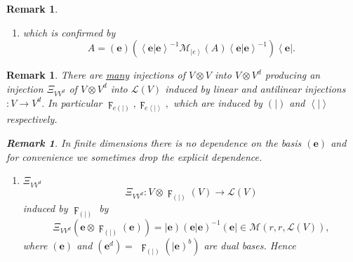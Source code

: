 \documentclass[aps,preprint]{revtex4}%
\newtheorem{remark}[theorem]{Remark}
\begin{document}
\begin{remark}
\begin{enumerate}
\item which is confirmed by
\begin{equation}
A=\left(  \mathbf{e}\right)  \left(  \overset{}{\left\langle \left.
\mathbf{e}\right\vert \mathbf{e}\right\rangle ^{-1}\mathcal{M}_{\left\vert
e\right\rangle }\left(  A\right)  \left\langle \left.  \mathbf{e}\right\vert
\mathbf{e}\right\rangle ^{-1}}\right)  \left\langle \mathbf{e}\right\vert .
\end{equation}

\end{enumerate}
\end{remark}

\begin{remark}
There are \underline{\emph{many}} injections of $V\otimes V$ into $V\otimes
V^{d}$ producing an injection $\Xi_{VV^{d}}$ of $V\otimes V^{d}$ into
$\mathcal{L}\left(  V\right)  $ induced by linear and antilinear injections
$:V\rightarrow V^{d}.$ In particular $\digamma_{e\left(  \left.  {}\right\vert
\right)  },\digamma_{e\left\langle \left.  {}\right\vert \right\rangle },$
which are induced by $\left(  \left.  {}\right\vert \right)  $ and
$\left\langle \left.  {}\right\vert \right\rangle $ respectively.

\begin{remark}
In finite dimensions there is no dependence on the basis $\left(
\mathbf{e}\right)  $ and for convenience we sometimes drop the explicit dependence.
\end{remark}

\begin{enumerate}
\item $\Xi_{VV^{d}}$
\begin{equation}
\Xi_{VV^{d}}:V\otimes\digamma_{\left(  \left.  {}\right\vert \right)  }\left(
V\right)  \rightarrow\mathcal{L}\left(  V\right)
\end{equation}
induced by $\digamma_{\left(  \left.  {}\right\vert \right)  }$ by
\begin{equation}
\Xi_{VV^{d}}\left(  \mathbf{e}\otimes\digamma_{\left(  \left.  {}\right\vert
\right)  }\left(  \mathbf{e}\right)  \right)  =\left\vert \mathbf{e}\right)
\left(  \left.  \mathbf{e}\right\vert \mathbf{e}\right)  ^{-1}\left(
\mathbf{e}\right\vert \in\mathcal{M}\left(  r,r,\mathcal{L}\left(  V\right)
\right)  ,
\end{equation}
where $\left(  \mathbf{e}\right)  $ and $\left(  \mathbf{e}^{d}\right)  =$
$\digamma_{\left(  \left.  {}\right\vert \right)  }\left(  \left\vert
\mathbf{e}\right)  ^{b}\right)  $ are dual bases. Hence


\end{enumerate}
\end{remark}
\end{document}
